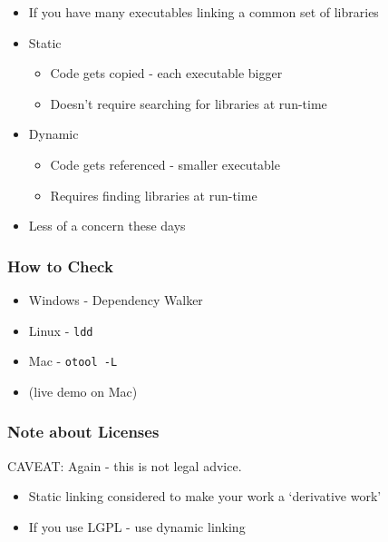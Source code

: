 \begin{itemize}
\itemsep1pt\parskip0pt
\item
  If you have many executables linking a common set of libraries
\item
  Static

  \begin{itemize}
  \itemsep1pt\parskip0pt
  \item
    Code gets copied - each executable bigger
  \item
    Doesn't require searching for libraries at run-time
  \end{itemize}
\item
  Dynamic

  \begin{itemize}
  \itemsep1pt\parskip0pt
  \item
    Code gets referenced - smaller executable
  \item
    Requires finding libraries at run-time
  \end{itemize}
\item
  Less of a concern these days
\end{itemize}

\subsubsection{How to Check}\label{how-to-check}

\begin{itemize}
\itemsep1pt\parskip0pt
\item
  Windows - Dependency Walker
\item
  Linux - \texttt{ldd}
\item
  Mac - \texttt{otool -L}
\item
  (live demo on Mac)
\end{itemize}

\subsubsection{Note about Licenses}\label{note-about-licenses}

CAVEAT: Again - this is not legal advice.

\begin{itemize}
\itemsep1pt\parskip0pt
\item
  Static linking considered to make your work a `derivative work'
\item
  If you use LGPL - use dynamic linking
\end{itemize}

